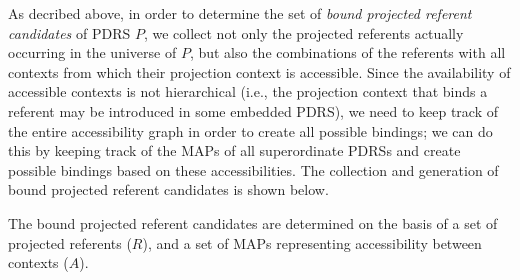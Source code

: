As decribed above, in order to determine the set of \textit{bound projected
referent candidates} of PDRS $P$, we collect not only the projected
referents actually occurring in the universe of $P$, but also the
combinations of the referents with all contexts from which their projection
context is accessible. Since the availability of accessible contexts is not
hierarchical (i.e., the projection context that binds a referent may be
introduced in some embedded PDRS), we need to keep track of the entire
accessibility graph in order to create all possible bindings; we can do this
by keeping track of the MAPs of all superordinate PDRSs and create possible
bindings based on these accessibilities. The collection and generation of
bound projected referent candidates is shown below. 

\begin{subdefinition}\label{def:bprcs}
  The bound projected referent candidates are determined on the basis of a
  set of projected referents ($R$), and a set of MAPs representing
  accessibility between contexts ($A$).
\end{subdefinition}
